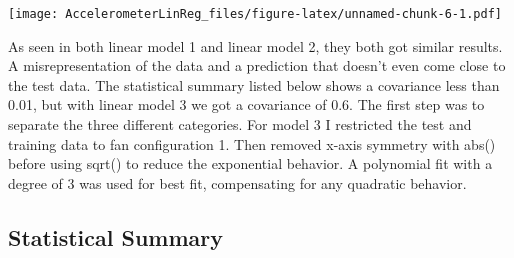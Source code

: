 \documentclass[
]{article}
\begin{document}
\texttt{[image: AccelerometerLinReg\_files/figure-latex/unnamed-chunk-6-1.pdf]}

As seen in both linear model 1 and linear model 2, they both got similar
results. A misrepresentation of the data and a prediction that doesn't
even come close to the test data. The statistical summary listed below
shows a covariance less than 0.01, but with linear model 3 we got a
covariance of 0.6. The first step was to separate the three different
categories. For model 3 I restricted the test and training data to fan
configuration 1. Then removed x-axis symmetry with abs() before using
sqrt() to reduce the exponential behavior. A polynomial fit with a
degree of 3 was used for best fit, compensating for any quadratic
behavior.

\hypertarget{statistical-summary}{%
\subsection{Statistical Summary}\label{statistical-summary}}
\end{document}
